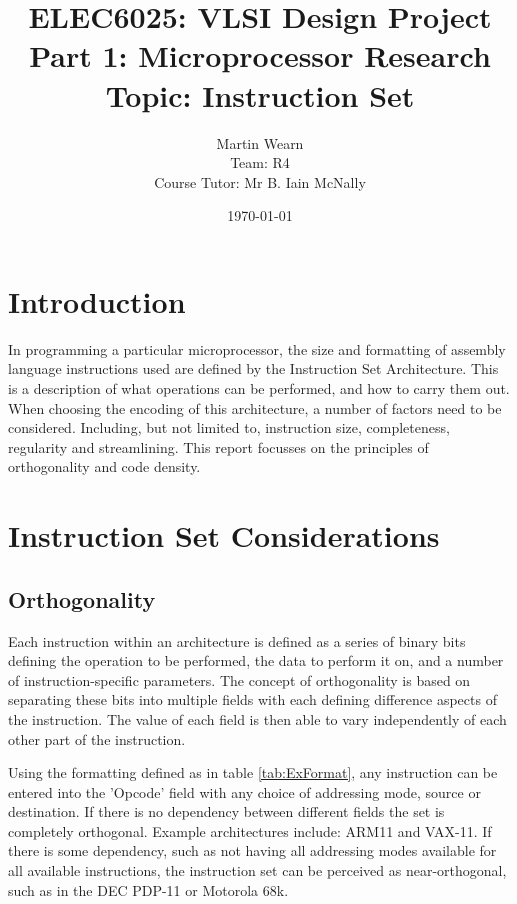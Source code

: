\documentclass[12pt,a4paper]{article}
\title{ELEC6025: VLSI Design Project \\Part 1: Microprocessor Research\\Topic: Instruction Set}
\author{Martin Wearn\\ Team: R4\\Course Tutor: Mr B. Iain McNally}
\date{\today}
\begin{document}
\begin{titlepage}
\maketitle
\end{titlepage}

\tableofcontents
\clearpage

\section{Introduction}
In programming a particular microprocessor, the size and formatting of assembly language instructions used are defined by the Instruction Set Architecture. This is a description of what operations can be performed, and how to carry them out. When choosing the encoding of this architecture, a number of factors need to be considered. Including, but not limited to, instruction size, completeness, regularity and streamlining. This report focusses on the principles of orthogonality and code density. 

\section{Instruction Set Considerations}

\subsection{Orthogonality}
Each instruction within an architecture is defined as a series of binary bits defining the operation to be performed, the data to perform it on, and a number of instruction-specific parameters. 
The concept of orthogonality is based on separating these bits into multiple fields with each defining difference aspects of the instruction. 
The value of each field is then able to vary independently of each other part of the instruction. \cite{wiki:OrthogonalIS}

Using the formatting defined as in table \ref{tab:ExFormat}, any instruction can be entered into the 'Opcode' field with any choice of addressing mode, source or destination. If there is no dependency between different fields the set is completely orthogonal. Example architectures include: ARM11 and VAX-11. \cite{wiki:OrthogonalIS}
If there is some dependency, such as not having all addressing modes available for all available instructions, the instruction set can be perceived as near-orthogonal, such as in the DEC PDP-11 or Motorola 68k. \cite{wiki:OrthogonalIS}
\end{document}
